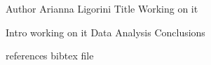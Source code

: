 Author Arianna Ligorini 
Title Working on it

Intro working on it
Data
Analysis
Conclusions


references
bibtex file
